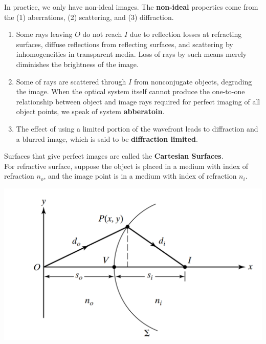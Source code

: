 \documentclass[11pt]{book}
\theoremstyle{break}
\theoremstyle{break}
\begin{document}
In practice, we only have non-ideal images. The \textbf{non-ideal} properties come from the (1) aberrations, (2) scattering, and (3) diffraction. \begin{enumerate}[topsep=3pt,itemsep=-1ex,partopsep=1ex,parsep=1ex]
\item Some rays leaving $O$ do not reach $I$ due to reflection losses at refracting surfaces, diffuse reflections from reflecting surfaces, and scattering by inhomogeneities in transparent media. Loss of rays by
such means merely diminishes the brightness of the image.
\item Some of rays are scattered through $I$ from nonconjugate objects, degrading the image. When the optical system itself cannot produce the one-to-one relationship between object and image rays required for perfect imaging of all object points, we speak of system \textbf{abberatoin}. 
\item The effect of using a limited portion of the wavefront leads to diffraction
and a blurred image, which is said to be \textbf{diffraction limited}.
\end{enumerate} 
Surfaces that give perfect images are called the \textbf{Cartesian Surfaces}. \\



For refractive surface, suppose the object is placed in a medium with index of refraction $n_o$, and the image point is in a medium with index of refraction $n_i$. \\

\begin{center}
\includegraphics[scale=0.3]{catesianSurfaces.png}
\end{center}
\end{document}
